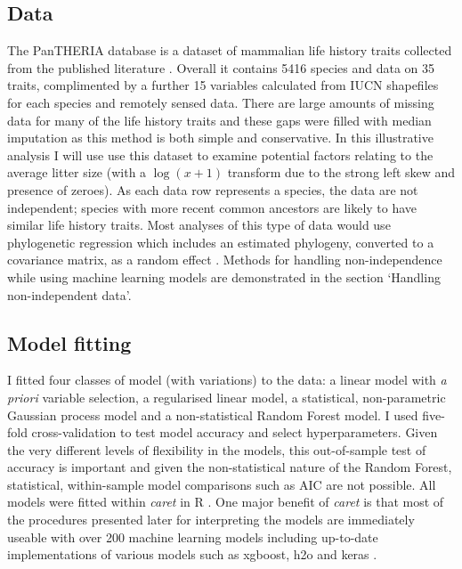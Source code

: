 \documentclass[10pt,]{article}
\begin{document}
\subsection{Data}\label{data}

The PanTHERIA database is a dataset of mammalian life history traits collected from the published literature \citep{jones2009pantheria}. Overall it contains 5416 species and data on 35 traits, complimented by a further 15 variables calculated from IUCN shapefiles for each species and remotely sensed data. There are large amounts of missing data for many of the life history traits and these gaps were filled with median imputation as this method is both simple and conservative. In this illustrative analysis I will use use this dataset to examine potential factors relating to the average litter size (with a \(\log(x+1)\) transform due to the strong left skew and presence of zeroes). As each data row represents a species, the data are not independent; species with more recent common ancestors are likely to have similar life history traits. Most analyses of this type of data \citep{gay2014parasite, pellissier2012shifts, ferguson2014colony} would use phylogenetic regression which includes an estimated phylogeny, converted to a covariance matrix, as a random effect \citep{magnusson2017glmmtmb, caper}. Methods for handling non-independence while using machine learning models are demonstrated in the section `Handling non-independent data'.

\subsection{Model fitting}\label{model-fitting}

I fitted four classes of model (with variations) to the data: a linear model with \emph{a priori} variable selection, a regularised linear model, a statistical, non-parametric Gaussian process model and a non-statistical Random Forest model. I used five-fold cross-validation to test model accuracy and select hyperparameters. Given the very different levels of flexibility in the models, this out-of-sample test of accuracy is important and given the non-statistical nature of the Random Forest, statistical, within-sample model comparisons such as AIC are not possible. All models were fitted within \emph{caret} \citep{caret} in R \citep{R}. One major benefit of \emph{caret} is that most of the procedures presented later for interpreting the models are immediately useable with over 200 machine learning models including up-to-date implementations of various models such as xgboost, h2o and keras \citep{xgboost, h2o, keras}.
\end{document}
